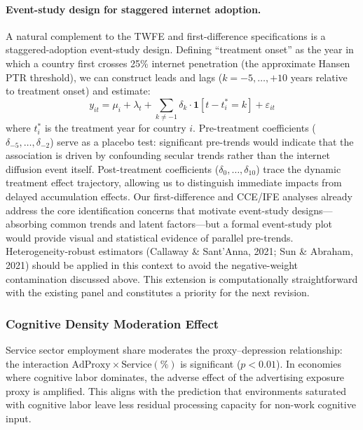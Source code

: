 \documentclass[a4paper,11pt,titlepage]{article}
\begin{document}
\paragraph{Event-study design for staggered internet adoption.}
A natural complement to the TWFE and first-difference specifications is a staggered-adoption event-study design. Defining ``treatment onset'' as the year in which a country first crosses 25\% internet penetration (the approximate Hansen PTR threshold), we can construct leads and lags ($k = -5, \ldots, +10$ years relative to treatment onset) and estimate:
\begin{equation}
y_{it} = \mu_i + \lambda_t + \sum_{k \neq -1} \delta_k \cdot \mathbf{1}[t - t_i^* = k] + \varepsilon_{it}
\label{eq:event-study}
\end{equation}
where $t_i^*$ is the treatment year for country $i$. Pre-treatment coefficients ($\delta_{-5}, \ldots, \delta_{-2}$) serve as a placebo test: significant pre-trends would indicate that the association is driven by confounding secular trends rather than the internet diffusion event itself. Post-treatment coefficients ($\delta_0, \ldots, \delta_{10}$) trace the dynamic treatment effect trajectory, allowing us to distinguish immediate impacts from delayed accumulation effects. Our first-difference and CCE/IFE analyses already address the core identification concerns that motivate event-study designs---absorbing common trends and latent factors---but a formal event-study plot would provide visual and statistical evidence of parallel pre-trends. Heterogeneity-robust estimators (Callaway \& Sant'Anna, 2021; Sun \& Abraham, 2021) should be applied in this context to avoid the negative-weight contamination discussed above. This extension is computationally straightforward with the existing panel and constitutes a priority for the next revision.


\subsubsection{Cognitive Density Moderation Effect}\label{sec:service-sector}

Service sector employment share moderates the proxy--depression relationship: the interaction $\text{AdProxy} \times \text{Service}(\%)$ is significant ($p < 0.01$). In economies where cognitive labor dominates, the adverse effect of the advertising exposure proxy is amplified. This aligns with the prediction that environments saturated with cognitive labor leave less residual processing capacity for non-work cognitive input.
\end{document}
